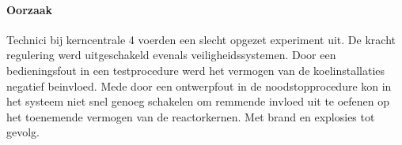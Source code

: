 \documentclass{article}
\begin{document}
	\paragraph{Oorzaak}
	\newline \indent
	
	Technici bij kerncentrale 4 voerden een slecht opgezet experiment uit. De  kracht regulering werd uitgeschakeld evenals veiligheidssystemen. 
	Door een bedieningsfout in een testprocedure werd het vermogen van de koelinstallaties negatief beinvloed. Mede door een ontwerpfout in de noodstopprocedure kon in het systeem niet snel genoeg schakelen om remmende invloed uit te oefenen op het toenemende vermogen van de reactorkernen. Met brand en explosies tot gevolg.
\end{document}
